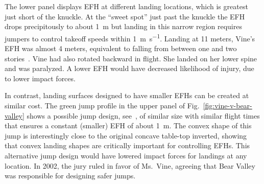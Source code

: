 \documentclass[smallextended]{svjour3}       %
\begin{document}
The lower panel displays EFH at different landing locations, which is greatest
just short of the knuckle.
At the ``sweet spot'' just past the knuckle the EFH drops
precipitously to  about 1~\si{\meter} but landing in this narrow region
requires jumpers to control takeoff speeds within
1~\si{\meter\per\second}. Landing at 11 meters, Vine's
EFH was almost 4 meters, equivalent to falling from between
one and two stories~\cite{Vish2005}. Vine had also rotated backward in
flight. She landed on her lower spine and was paralyzed. A lower EFH would have decreased likelihood of injury, due to lower impact forces.

In contrast, landing surfaces designed to have smaller EFHs can be created at similar cost. The
green jump profile in the upper panel of Fig.~\ref{fig:vine-v-bear-valley}
shows a possible jump design, see~\cite{Levy2015}, of similar size with similar
flight times that ensures a constant (smaller) EFH of about 1~\si{\meter}. The convex shape of this jump is interestingly
close to the original concave table-top  inverted,
showing that convex landing shapes are critically important for controlling EFHs. This alternative jump design would have lowered impact
forces for landings at any location. In 2002, the jury ruled in favor of
Ms.~Vine, agreeing that Bear Valley was responsible for designing safer jumps.
\end{document}
